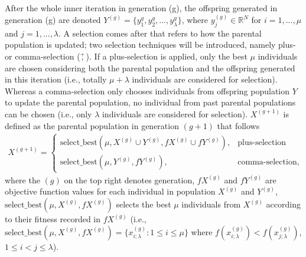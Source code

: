 After the whole inner iteration in generation (g), the offspring generated in generation (g) are denoted $Y^{(g)} = \{y_1^{g},y_2^{g},...,y_{\lambda}^{g} \}$, where $y_j^{(g)} \in \mathbb{R}^N$ for $i=1,...,\mu$ and $j=1,...,\lambda$. A selection comes after that refers to how the parental population is updated; two selection techniques will be introduced, namely plus- or comma-selection ($\overset{+}{,}$). If a plus-selection is applied, only the best $\mu$ individuals are chosen considering both the parental population and the offspring generated in this iteration (i.e., totally $\mu+\lambda$ individuals are considered for selection). Whereas a comma-selection only chooses individuals from offspring population $Y$ to update the parental population, no individual from past parental populations can be chosen (i.e., only $\lambda$ individuals are considered for selection). $X^{(g+1)}$ is defined as the parental population in generation $(g+1)$ that follows
\begin{align}
X^{(g+1)} = 
\begin{cases}
\text{select\_best}(\mu,X^{(g)}\cup Y^{(g)},fX^{(g)} \cup fY^{(g)}), & \text{plus-selection}\\
\text{select\_best}(\mu,Y^{(g)},fY^{(g)}) , & \text{comma-selection},
\end{cases}
\end{align}
where the $(g)$ on the top right denotes generation, $fX^{(g)}$ and $fY^{(g)}$ are objective function values for each individual in population $X^{(g)}$ and $Y^{(g)}$, $\text{select\_best}(\mu,X^{(g)},fX^{(g)})$ selects the best $\mu$ individuals from $X^{(g)}$ according to their fitness recorded in $fX^{(g)}$ (i.e., $\text{select\_best}(\mu,X^{(g)},fX^{(g)}) = \{x_{i;\lambda}^{(g)}: 1 \leq i \leq \mu \}$ where $f(x_{i;\lambda}^{(g)}) < f(x_{j;\lambda}^{(g)})$, $1 \leq i < j \leq \lambda$).

